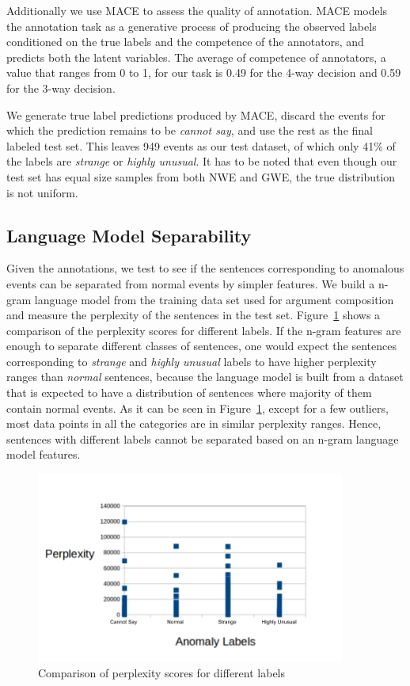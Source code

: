Additionally we use
MACE \citep{hovy2013learning} to assess the quality of 
annotation.  MACE models the annotation task as a generative process of
producing the observed labels conditioned on the 
true labels and the competence of the annotators, and predicts both the latent
variables.  The average of competence of annotators, 
a value that ranges from 0 to 1, for our task is 0.49 for the 4-way decision and
0.59 for the 3-way decision.  

We generate
true label predictions produced by MACE, discard the events for which the
prediction remains to be \textit{cannot say}, and use the 
rest as the final labeled test set.  This leaves 949 events as our test dataset,
of which only 41\% of the labels are \textit{strange} or \textit{highly
unusual}.  It has to be noted that even though our test set 
has equal size samples from both NWE and GWE, the true distribution is not
uniform.

\subsection{Language Model Separability}
Given the annotations, we test to see if the
sentences corresponding to anomalous events can be separated from normal events 
by simpler 
features.  We build a n-gram language model from the training data set used for 
argument composition and 
measure the perplexity of the sentences in the test set.  
Figure~\ref{fig:nem_lm_ppl} shows
a comparison of the perplexity scores for different labels. If the n-gram 
features are enough 
to separate different classes of sentences, one would expect the sentences 
corresponding to 
\textit{strange} and \textit{highly unusual} labels to have higher perplexity 
ranges than \textit{normal}
sentences, because the language model is built from a dataset that is expected 
to have a distribution of
sentences where majority of them contain normal events.  As it can be seen in 
Figure~\ref{fig:nem_lm_ppl}, 
except for a few outliers, most data points in all the categories are in similar 
perplexity ranges.
Hence, sentences with different labels cannot be separated based on an n-gram 
language model features.

\begin{figure}
  \begin{center}
  \includegraphics[width=4in]{figures/perplexity-comparison.png}
  \caption{Comparison of perplexity scores for different labels}
  \label{fig:nem_lm_ppl}
  \end{center}
\end{figure}

